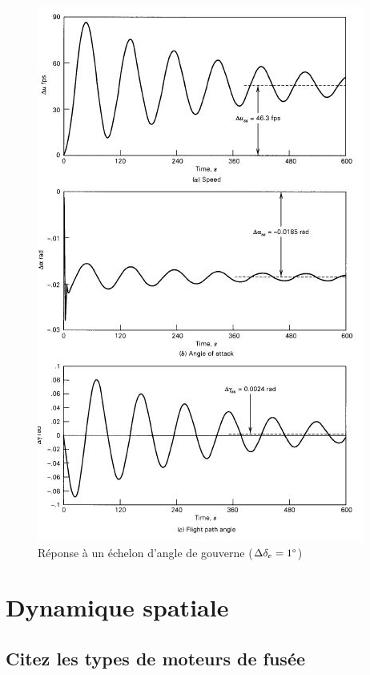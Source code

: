 \documentclass{report}
\begin{document}
\begin{figure}[h!]
    \centering
    \includegraphics[scale=0.6]{62.JPG}
    \caption{Réponse à un échelon d’angle de gouverne ($\Delta\delta_e=1\degree$)}
    \label{62}
\end{figure}




\chapter{Dynamique spatiale}

\section{Citez les types de moteurs de fusée}
\end{document}
